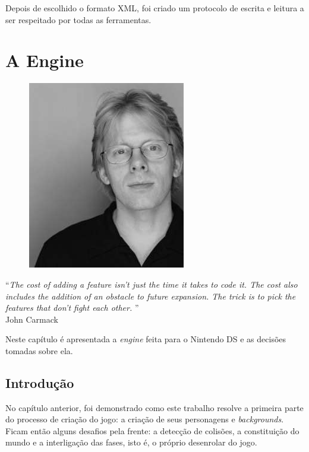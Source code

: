 \documentclass[brazil]{abnt}
\begin{document}
Depois de escolhido o formato XML, foi criado um protocolo de escrita e leitura a ser respeitado por todas as ferramentas.



\chapter{A Engine}

\vfill{}
\begin{flushright}{}
\begin{figure}[h!]
\hfill\includegraphics{imgs/carmack.jpg}
\end{figure}
``\emph{The cost of adding a feature isn't just the time it takes to code it. The cost also includes the addition of an obstacle to future expansion. The trick is to pick the features that don't fight each other. }''\\
{\small John Carmack}\end{flushright}{\small \par}
\vfill{}

Neste capítulo é apresentada a \textit{engine} feita para o Nintendo DS e as decisões tomadas sobre ela.
\newpage

\section{Introdução}

No capítulo anterior, foi demonstrado como este trabalho resolve a primeira parte do processo de criação do jogo: a criação de seus personagens e \textit{backgrounds}. Ficam então alguns desafios pela frente: a detecção de colisões, a constituição do mundo e a interligação das fases, isto é, o próprio desenrolar do jogo.
\end{document}
